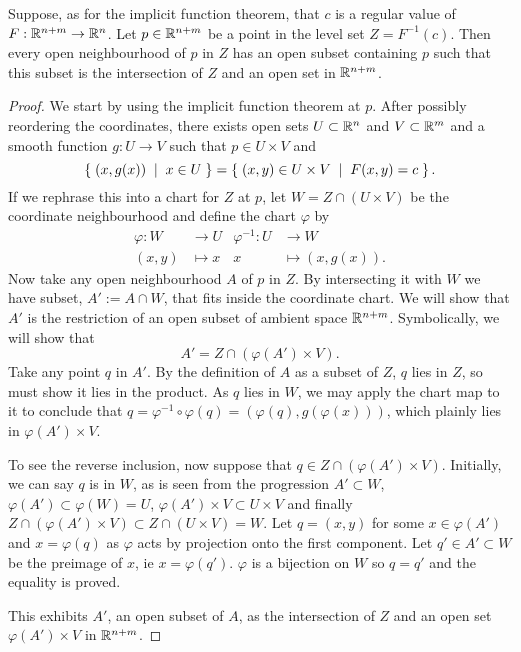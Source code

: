 \begin{lem}
Suppose, as for the implicit function theorem, that $c$ is a regular value of $F : \mathbb{R}^{n+m} \to \mathbb{R}^n$. Let $p \in \mathbb{R}^{n+m}$ be a point in the level set $Z = F^{-1}(c)$. Then every open neighbourhood of $p$ in $Z$ has an open subset containing $p$ such that this subset is the intersection of $Z$ and an open set in $\mathbb{R}^{n+m}$.

\begin{proof}
We start by using the implicit function theorem at $p$. After possibly reordering the coordinates, there exists open sets $U \subset \mathbb{R}^n$ and $V \subset \mathbb{R}^m$ and a smooth function $g : U \to V$ such that $p \in U\times V$ and
\[
\left\{\; (x,g(x)) \;\mid\; x \in U \;\right\} = \left\{\;  (x,y) \in U\times V \;\mid\; F(x,y) = c \;\right\}.
\]
If we rephrase this into a chart for $Z$ at $p$, let $W = Z \cap (U\times V)$ be the coordinate neighbourhood and define the chart $φ$ by
\begin{align*}
φ : W &\to U            &          φ^{-1} : U &\to W \\
(x,y) &\mapsto x        &                   x &\mapsto (x, g(x)).
\end{align*}
Now take any open neighbourhood $A$ of $p$ in $Z$. By intersecting it with $W$ we have subset, $A' := A \cap W$, that fits inside the coordinate chart. We will show that $A'$ is the restriction of an open subset of ambient space $\mathbb{R}^{n+m}$. Symbolically, we will show that
\[
A' = Z \cap (φ(A') \times V).
\]
Take any point $q$ in $A'$. By the definition of $A$ as a subset of $Z$, $q$ lies in $Z$, so must show it lies in the product. As $q$ lies in $W$,  we may apply the chart map to it to conclude that $q = φ^{-1} \circ φ(q) = (φ(q), g(φ(x)))$, which plainly lies in $φ(A') \times V$.

To see the reverse inclusion, now suppose that $q \in Z \cap (φ(A') \times V)$. Initially, we can say $q$ is in $W$, as is seen from the progression $A' \subset W$, $φ(A') \subset φ(W) = U$, $φ(A') \times V \subset U \times V$ and finally $Z \cap (φ(A') \times V) \subset Z \cap (U\times V) = W $. Let $q = (x,y)$ for some $x \in φ(A')$ and $x = φ(q)$ as $φ$ acts by projection onto the first component. Let $q' \in A' \subset W$ be the preimage of $x$, ie $x = φ(q')$. $φ$ is a bijection on $W$ so $q=q'$ and the equality is proved.

This exhibits $A'$, an open subset of $A$, as the intersection of $Z$ and an open set $φ(A') \times V$ in $\mathbb{R}^{n+m}$.
\end{proof}
\end{lem}

